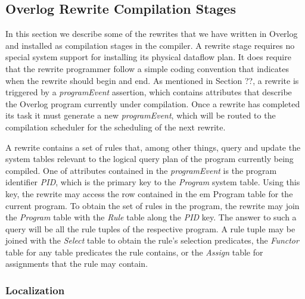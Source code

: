 \documentclass{vldb}
\begin{document}
\subsection{Overlog Rewrite Compilation Stages}

In this section we describe some of the rewrites that we have written in Overlog
and installed as compilation stages in the compiler.  A rewrite stage requires
no special system support for installing its physical dataflow plan. It does
require that the rewrite programmer follow a simple coding convention that
indicates when the rewrite should begin and end. As mentioned in Section ??,
a rewrite is triggered by a {\em programEvent} assertion, which contains attributes 
that describe the Overlog program currently under compilation.  Once a
rewrite has completed its task it must generate a new {\em programEvent}, 
which will be routed to the compilation scheduler for the scheduling of the next rewrite.

A rewrite contains a set of rules that, among other things, query and update 
the system tables relevant to the logical query plan of
the program currently being compiled. One of attributes contained in the
{\em programEvent} is the program identifier {\em PID}, which is the primary 
key to the {\em Program} system table. Using this key,
the rewrite may access the row contained in the {em Program} table for
the current program. To obtain the set of rules in the program, the rewrite
may join the {\em Program} table with the {\em Rule} table along the
{\em PID} key.  The answer to such a query will be all the rule tuples of
the respective program. A rule tuple may be joined with
the {\em Select} table to obtain the rule's selection predicates, 
the {\em Functor} table for any table predicates the rule contains,
or the {\em Assign} table for assignments that the rule may contain. 

\subsubsection{Localization}
\end{document}
